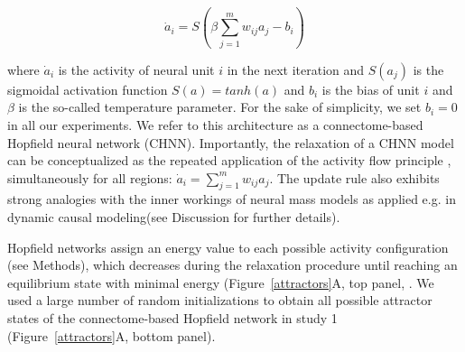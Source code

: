 \documentclass{article}
\begin{document}
\begin{equation}
\label{hopfield-update}
\dot{a}_i = S(\beta \sum_{j=1}^m w_{ij}a_j - b_i)
\end{equation}

where $\dot{a}_i$ is the activity of neural unit $i$ in the next iteration and $S(a_j)$ is the sigmoidal activation
function $S(a) = tanh(a)$ and $b_i$ is the bias of unit $i$ and $\beta$ is the so-called temperature parameter. For the sake of simplicity, we set $b_i=0$ in all our experiments. We refer to this architecture as a connectome-based
Hopfield neural network (CHNN). Importantly, the relaxation of a CHNN model can be conceptualized as the repeated
application of the activity flow principle \citep{cole2016activity, ito2017cognitive} , simultaneously for all
regions: $\dot{a}_i = \sum_{j=1}^m w_{ij}a_j$. The update rule also exhibits strong analogies with the inner workings
of neural mass models \citep{breakspear2017dynamic} as applied e.g. in dynamic causal modeling(see Discussion for
further details).

Hopfield networks assign an energy value to each possible activity configuration (see Methods), which decreases during
the relaxation procedure until reaching an equilibrium state with minimal energy (Figure~\ref{attractors}A, top panel,
\citep{hopfield1982neural, koiran1994dynamics}.
We used a large number of random initializations to obtain all possible attractor states of the connectome-based
Hopfield network in study 1 (Figure~\ref{attractors}A, bottom panel).
\end{document}
